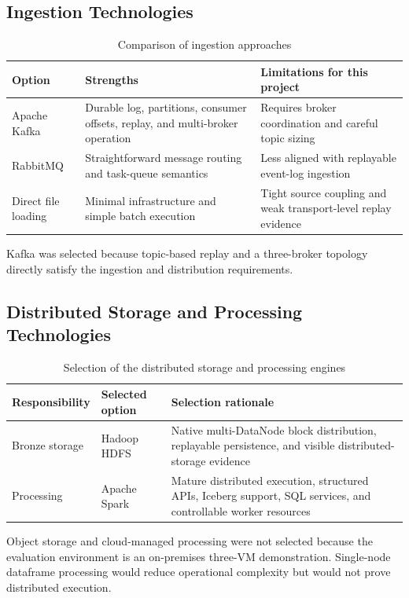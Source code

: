 \subsection{Ingestion Technologies}
\begin{table}[htbp]
    \centering
    \small
    \begin{tabularx}{\textwidth}{|p{}|X|X|}
        \hline
        \rowcolor{ModernTableHeader}
        \color{white}\textbf{Option} & \color{white}\textbf{Strengths} & \color{white}\textbf{Limitations for this project} \\
        \hline
        Apache Kafka & Durable log, partitions, consumer offsets, replay, and multi-broker operation & Requires broker coordination and careful topic sizing \\
        \hline
        RabbitMQ & Straightforward message routing and task-queue semantics & Less aligned with replayable event-log ingestion \\
        \hline
        Direct file loading & Minimal infrastructure and simple batch execution & Tight source coupling and weak transport-level replay evidence \\
        \hline
    \end{tabularx}
    \caption{Comparison of ingestion approaches}
    \label{tab:tech-ingestion-comparison}
\end{table}
Kafka was selected because topic-based replay and a three-broker topology directly satisfy the ingestion and distribution requirements.

\subsection{Distributed Storage and Processing Technologies}
\begin{table}[htbp]
    \centering
    \small
    \begin{tabularx}{\textwidth}{|p{}|p{}|X|}
        \hline
        \rowcolor{ModernTableHeader}
        \color{white}\textbf{Responsibility} & \color{white}\textbf{Selected option} & \color{white}\textbf{Selection rationale} \\
        \hline
        Bronze storage & Hadoop HDFS & Native multi-DataNode block distribution, replayable persistence, and visible distributed-storage evidence \\
        \hline
        Processing & Apache Spark & Mature distributed execution, structured APIs, Iceberg support, SQL services, and controllable worker resources \\
        \hline
    \end{tabularx}
    \caption{Selection of the distributed storage and processing engines}
    \label{tab:tech-storage-processing-selection}
\end{table}
Object storage and cloud-managed processing were not selected because the evaluation environment is an on-premises three-VM demonstration. Single-node dataframe processing would reduce operational complexity but would not prove distributed execution.

